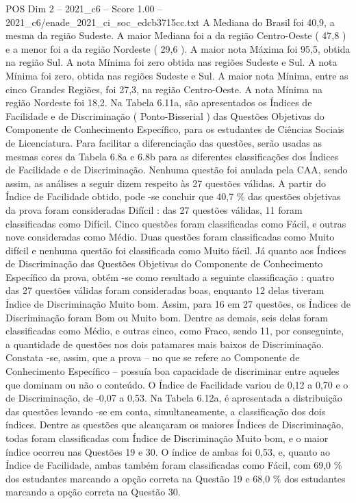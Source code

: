 \begin{textsample}{POS Dim 2 – 2021\_c6 – Score 1.00 – 2021\_c6/enade\_2021\_ci\_soc\_edcb3715cc.txt}
A Mediana do Brasil foi 40,9, a mesma da região Sudeste.
A maior Mediana foi a da região Centro-Oeste ( 47,8 ) e a menor foi a da região Nordeste ( 29,6 ).
A maior nota Máxima foi 95,5, obtida na região Sul.
A nota Mínima foi zero obtida nas regiões Sudeste e Sul.
A nota Mínima foi zero, obtida nas regiões Sudeste e Sul.
A maior nota Mínima, entre as cinco Grandes Regiões, foi 27,3, na região Centro-Oeste.
A nota Mínima na região Nordeste foi 18,2.
Na Tabela 6.11a, são apresentados os Índices de Facilidade e de Discriminação ( Ponto-Bisserial ) das Questões Objetivas do Componente de Conhecimento Específico, para os estudantes de Ciências Sociais de Licenciatura.
Para facilitar a diferenciação das questões, serão usadas as mesmas cores da Tabela 6.8a e 6.8b para as diferentes classificações dos Índices de Facilidade e de Discriminação.
Nenhuma questão foi anulada pela CAA, sendo assim, as análises a seguir dizem respeito às 27 questões válidas.
A partir do Índice de Facilidade obtido, pode -se concluir que 40,7 \% das questões objetivas da prova foram consideradas Difícil : das 27 questões válidas, 11 foram classificadas como Difícil.
Cinco questões foram classificadas como Fácil, e outras nove consideradas como Médio.
Duas questões foram classificadas como Muito difícil e nenhuma questão foi classificada como Muito fácil.
Já quanto aos Índices de Discriminação das Questões Objetivas do Componente de Conhecimento Específico da prova, obtém -se como resultado a seguinte classificação : quatro das 27 questões válidas foram consideradas boas, enquanto 12 delas tiveram Índice de Discriminação Muito bom.
Assim, para 16 em 27 questões, os Índices de Discriminação foram Bom ou Muito bom.
Dentre as demais, seis delas foram classificadas como Médio, e outras cinco, como Fraco, sendo 11, por conseguinte, a quantidade de questões nos dois patamares mais baixos de Discriminação.
Constata -se, assim, que a prova – no que se refere ao Componente de Conhecimento Específico – possuía boa capacidade de discriminar entre aqueles que dominam ou não o conteúdo.
O Índice de Facilidade variou de 0,12 a 0,70 e o de Discriminação, de -0,07 a 0,53.
Na Tabela 6.12a, é apresentada a distribuição das questões levando -se em conta, simultaneamente, a classificação dos dois índices.
Dentre as questões que alcançaram os maiores Índices de Discriminação, todas foram classificadas com Índice de Discriminação Muito bom, e o maior índice ocorreu nas Questões 19 e 30.
O índice de ambas foi 0,53, e, quanto ao Índice de Facilidade, ambas também foram classificadas como Fácil, com 69,0 \% dos estudantes marcando a opção correta na Questão 19 e 68,0 \% dos estudantes marcando a opção correta na Questão 30.

\end{textsample}
